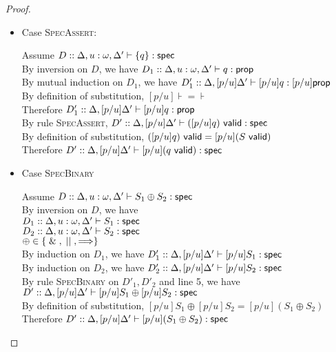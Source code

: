 \begin{proof}
\begin{enumerate}
\begin{itemize}
    \item Case \textsc{SpecAssert}:
      \begin{tabbedproof}
        \oo Assume $D :: \judgeS[{\Delta, u:\omega, \Delta'}]{\setof{q}}$ \\
        \ooo By inversion on $D$, we have $D_1 :: \judgeA[{\Delta, u:\omega, \Delta'}]{q}{\assert}$ \\
        \ooo By mutual induction on $D_1$, we have 
              $D'_1 :: \judgeA[{\Delta, [p/u]\Delta'}]{[p/u]q}{[p/u]\assert}$ \\
        \ooo By definition of substitution, $[p/u]\assert = \assert$ \\
        \ooo Therefore $D'_1 :: \judgeA[{\Delta, [p/u]\Delta'}]{[p/u]q}{\assert}$ \\
        \ooo By rule \textsc{SpecAssert}, 
              $D' :: \judgeS[{\Delta, [p/u]\Delta'}]{\validprop{([p/u]q)}}$ \\
        \ooo By definition of substitution, $\validprop{([p/u]q)} = [p/u](\validprop{S})$ \\
        \ooo Therefore 
             $D' :: \judgeS[{\Delta, [p/u]\Delta'}]{[p/u](\validprop{q})}$ \\
      \end{tabbedproof}

    \item Case \textsc{SpecBinary}
      \begin{tabbedproof}
        \oo Assume $D :: \judgeS[{\Delta, u:\omega, \Delta'}]{S_1 \oplus S_2}$ \\
        \ooo By inversion on $D$, we have \\
        \oooo $D_1 :: \judgeS[{\Delta, u:\omega, \Delta'}]{S_1}$ \\
        \oooo $D_2 :: \judgeS[{\Delta, u:\omega, \Delta'}]{S_2}$ \\
        \oooo $\oplus \in \setof{\specand, \specor, \specimp}$ \\
        \ooo By induction on $D_1$, we have 
               $D'_1 :: \judgeS[{\Delta, [p/u]\Delta'}]{[p/u]S_1}$ \\
        \ooo By induction on $D_2$, we have 
               $D'_2 :: \judgeS[{\Delta, [p/u]\Delta'}]{[p/u]S_2}$ \\
        \ooo By rule \textsc{SpecBinary} on $D'_1, D'_2$ and line 5, we have \\
        \ooox $D' :: \judgeS[{\Delta, [p/u]\Delta'}]{[p/u]S_1 \oplus [p/u]S_2}$ \\
        \ooo By definition of substitution, $[p/u]S_1 \oplus [p/u]S_2 = [p/u](S_1 \oplus S_2)$ \\
        \ooo Therefore $D' :: \judgeS[{\Delta, [p/u]\Delta'}]{[p/u](S_1 \oplus S_2)}$ \\
      \end{tabbedproof}
    \end{itemize}
  \end{enumerate}
\end{proof}
  

